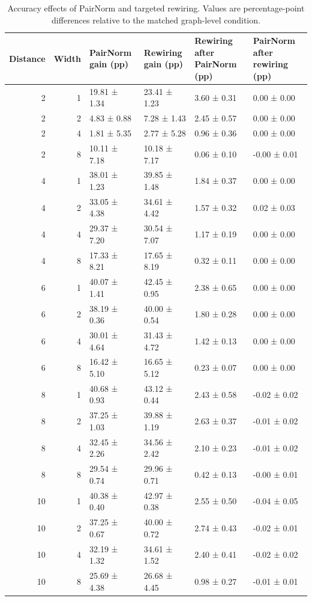 \begin{table}[htbp]
\caption{Accuracy effects of PairNorm and targeted rewiring. Values are percentage-point differences relative to the matched graph-level condition.}
\label{tab:longrange_intervention_effects}
\begin{tabular}{rrllll}
\toprule
Distance & Width & PairNorm gain (pp) & Rewiring gain (pp) & Rewiring after PairNorm (pp) & PairNorm after rewiring (pp) \\
\midrule
2 & 1 & 19.81 ± 1.34 & 23.41 ± 1.23 & 3.60 ± 0.31 & 0.00 ± 0.00 \\
2 & 2 & 4.83 ± 0.88 & 7.28 ± 1.43 & 2.45 ± 0.57 & 0.00 ± 0.00 \\
2 & 4 & 1.81 ± 5.35 & 2.77 ± 5.28 & 0.96 ± 0.36 & 0.00 ± 0.00 \\
2 & 8 & 10.11 ± 7.18 & 10.18 ± 7.17 & 0.06 ± 0.10 & -0.00 ± 0.01 \\
4 & 1 & 38.01 ± 1.23 & 39.85 ± 1.48 & 1.84 ± 0.37 & 0.00 ± 0.00 \\
4 & 2 & 33.05 ± 4.38 & 34.61 ± 4.42 & 1.57 ± 0.32 & 0.02 ± 0.03 \\
4 & 4 & 29.37 ± 7.20 & 30.54 ± 7.07 & 1.17 ± 0.19 & 0.00 ± 0.00 \\
4 & 8 & 17.33 ± 8.21 & 17.65 ± 8.19 & 0.32 ± 0.11 & 0.00 ± 0.00 \\
6 & 1 & 40.07 ± 1.41 & 42.45 ± 0.95 & 2.38 ± 0.65 & 0.00 ± 0.00 \\
6 & 2 & 38.19 ± 0.36 & 40.00 ± 0.54 & 1.80 ± 0.28 & 0.00 ± 0.00 \\
6 & 4 & 30.01 ± 4.64 & 31.43 ± 4.72 & 1.42 ± 0.13 & 0.00 ± 0.00 \\
6 & 8 & 16.42 ± 5.10 & 16.65 ± 5.12 & 0.23 ± 0.07 & 0.00 ± 0.00 \\
8 & 1 & 40.68 ± 0.93 & 43.12 ± 0.44 & 2.43 ± 0.58 & -0.02 ± 0.02 \\
8 & 2 & 37.25 ± 1.03 & 39.88 ± 1.19 & 2.63 ± 0.37 & -0.01 ± 0.02 \\
8 & 4 & 32.45 ± 2.26 & 34.56 ± 2.42 & 2.10 ± 0.23 & -0.01 ± 0.02 \\
8 & 8 & 29.54 ± 0.74 & 29.96 ± 0.71 & 0.42 ± 0.13 & -0.00 ± 0.01 \\
10 & 1 & 40.38 ± 0.40 & 42.97 ± 0.38 & 2.55 ± 0.50 & -0.04 ± 0.05 \\
10 & 2 & 37.25 ± 0.67 & 40.00 ± 0.72 & 2.74 ± 0.43 & -0.02 ± 0.01 \\
10 & 4 & 32.19 ± 1.32 & 34.61 ± 1.52 & 2.40 ± 0.41 & -0.02 ± 0.02 \\
10 & 8 & 25.69 ± 4.38 & 26.68 ± 4.45 & 0.98 ± 0.27 & -0.01 ± 0.01 \\
\bottomrule
\end{tabular}
\end{table}
